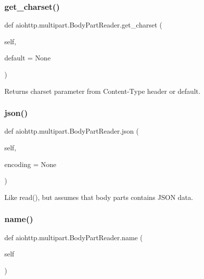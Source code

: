 \subsubsection{\texorpdfstring{get\+\_\+charset()}{get\_charset()}}
{\footnotesize\ttfamily def aiohttp.\+multipart.\+Body\+Part\+Reader.\+get\+\_\+charset (\begin{DoxyParamCaption}\item[{}]{self,  }\item[{}]{default = {\ttfamily None} }\end{DoxyParamCaption})}

\begin{DoxyVerb}Returns charset parameter from Content-Type header or default.\end{DoxyVerb}
 \mbox{\label{classaiohttp_1_1multipart_1_1_body_part_reader_a3ad9b8805390d178867f0cb763e701fb}} 
\subsubsection{\texorpdfstring{json()}{json()}}
{\footnotesize\ttfamily def aiohttp.\+multipart.\+Body\+Part\+Reader.\+json (\begin{DoxyParamCaption}\item[{}]{self,  }\item[{}]{encoding = {\ttfamily None} }\end{DoxyParamCaption})}

\begin{DoxyVerb}Like read(), but assumes that body parts contains JSON data.\end{DoxyVerb}
 \mbox{\label{classaiohttp_1_1multipart_1_1_body_part_reader_ab983ea22d799778976dc13a4a2a38bf3}} 
\subsubsection{\texorpdfstring{name()}{name()}}
{\footnotesize\ttfamily def aiohttp.\+multipart.\+Body\+Part\+Reader.\+name (\begin{DoxyParamCaption}\item[{}]{self }\end{DoxyParamCaption})}

